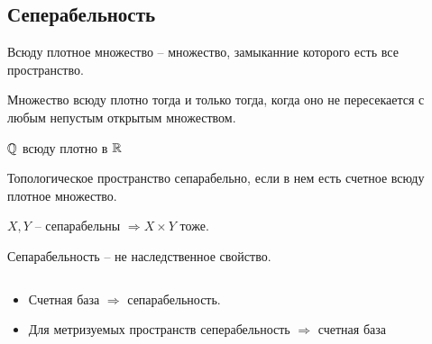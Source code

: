 \documentclass[12pt]{report}
\begin{document}
\subsection{Сеперабельность}
\begin{defn}
    Всюду плотное множество -- множество, замыканние которого есть все пространство.
\end{defn}
\begin{defn}
    Множество всюду плотно тогда и только тогда, когда оно не пересекается с любым непустым открытым множеством.
\end{defn}
\begin{ex}
    $ \mathbb{Q}$ всюду плотно в $ \mathbb{R}$
\end{ex}
\begin{defn}
    Топологическое пространство сепарабельно, если в нем есть счетное всюду плотное множество.
\end{defn}
\begin{prop}
        $ X, Y$ -- сепарабельны $ \Longrightarrow  X \times Y$  тоже.
\end{prop}
\begin{note}
    Сепарабельность -- не наследственное свойство.
\end{note}
\begin{thm}$ $
    \begin{itemize}
        \item Счетная база $ \Longrightarrow  $ сепарабельность.
	\item Для метризуемых пространств сеперабельность $\Longrightarrow$ счетная база
	\end{itemize}
\end{thm}
\end{document}
